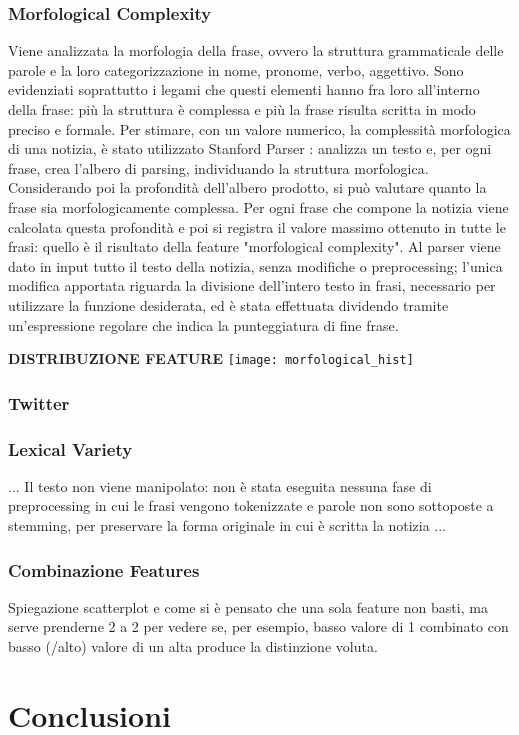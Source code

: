 \documentclass{article}
\begin{document}
\begin{multicols}{2}
				\subsubsection{Morfological Complexity}
					Viene analizzata la morfologia della frase, ovvero la struttura grammaticale delle parole e la loro categorizzazione in nome, pronome, verbo, aggettivo. Sono evidenziati soprattutto i legami che questi elementi hanno fra loro all'interno della frase: più la struttura è complessa e più la frase risulta scritta in modo preciso e formale. 
					Per stimare, con un valore numerico, la complessità morfologica di una notizia, è stato utilizzato Stanford Parser \cite{stanfordparser}: analizza un testo e, per ogni frase, crea l'albero di parsing, individuando la struttura morfologica. Considerando poi la profondità dell'albero prodotto, si può valutare quanto la frase sia morfologicamente complessa.
					Per ogni frase che compone la notizia viene calcolata questa profondità e poi si registra il valore massimo ottenuto in tutte le frasi: quello è il risultato della feature "morfological complexity".
					Al parser viene dato in input tutto il testo della notizia, senza modifiche o preprocessing; l'unica modifica apportata riguarda la divisione dell'intero testo in frasi, necessario per utilizzare la funzione desiderata, ed è stata effettuata dividendo tramite un'espressione regolare che indica la punteggiatura di fine frase.
					
					\textbf{DISTRIBUZIONE FEATURE}	
					\texttt{[image: morfological\_hist]}
									
					
					
				\subsubsection{Twitter}
				\subsubsection{Lexical Variety}
					... Il testo non viene manipolato: non è stata eseguita nessuna fase di preprocessing in cui le frasi vengono tokenizzate e parole non sono sottoposte a stemming, per preservare la forma originale in cui è scritta la notizia ...
				
				\subsubsection{Combinazione Features}
				Spiegazione scatterplot e come si è pensato che una sola feature non basti, ma serve prenderne 2 a 2 per vedere se, per esempio, basso valore di 1 combinato con basso (/alto) valore di un alta produce la distinzione voluta.
				

		\section{Conclusioni}
	
	
	   	\end{multicols}		    
\end{document}
